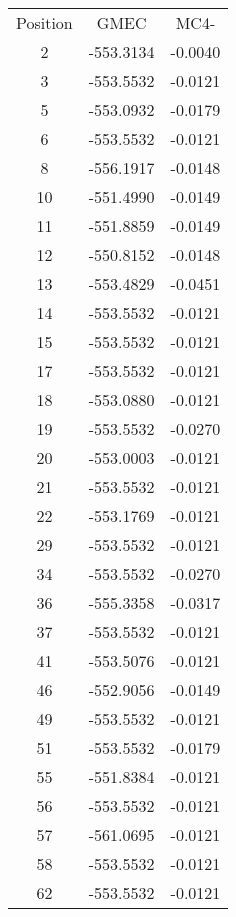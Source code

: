     \begin{table}[h]
      \centering

      \begin{tabular}{ccc}


        \toprule
        Position & GMEC & MC4- \\
        \cmidrule{1-3}
        2 & -553.3134 & -0.0040 \\
        3 & -553.5532 & -0.0121 \\
        5 & -553.0932 & -0.0179 \\
        6 & -553.5532 & -0.0121 \\
        8 & -556.1917 & -0.0148 \\
        10 & -551.4990 & -0.0149 \\
        11 & -551.8859 & -0.0149 \\
        12 & -550.8152 & -0.0148 \\
        13 & -553.4829 & -0.0451 \\
        14 & -553.5532 & -0.0121 \\
        15 & -553.5532 & -0.0121 \\
        17 & -553.5532 & -0.0121 \\
        18 & -553.0880 & -0.0121 \\
        19 & -553.5532 & -0.0270 \\
        20 & -553.0003 & -0.0121 \\
        21 & -553.5532 & -0.0121 \\
        22 & -553.1769 & -0.0121 \\
        29 & -553.5532 & -0.0121 \\
        34 & -553.5532 & -0.0270 \\
        36 & -555.3358 & -0.0317 \\
        37 & -553.5532 & -0.0121 \\
        41 & -553.5076 & -0.0121 \\
        46 & -552.9056 & -0.0149 \\
        49 & -553.5532 & -0.0121 \\
        51 & -553.5532 & -0.0179 \\
        55 & -551.8384 & -0.0121 \\
        56 & -553.5532 & -0.0121 \\
        57 & -561.0695 & -0.0121 \\
        58 & -553.5532 & -0.0121 \\
        62 & -553.5532 & -0.0121 \\

\end{tabular}
\end{table}
